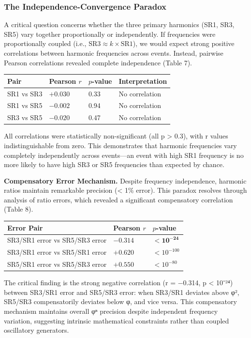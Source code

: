 \documentclass[11pt,a4paper]{article}
\begin{document}
\subsubsection{The Independence-Convergence Paradox}
A critical question concerns whether the three primary harmonics (SR1, SR3, SR5) vary together proportionally or independently. If frequencies were proportionally coupled (i.e., $\mathrm{SR3} \approx k \times \mathrm{SR1}$), we would expect strong positive correlations between harmonic frequencies across events. Instead, pairwise Pearson correlations revealed complete independence (Table 7).
\begin{table}[H]
    \centering
    \begin{tabular}{llll}
        \toprule
        Pair & Pearson $r$ & $p$-value & Interpretation \\
        \midrule
        SR1 vs SR3 & $+0.030$ & 0.33 & No correlation \\
        SR1 vs SR5 & $-0.002$ & 0.94 & No correlation \\
        SR3 vs SR5 & $-0.020$ & 0.47 & No correlation \\
        \bottomrule
    \end{tabular} \end{table}
All correlations were statistically non-significant (all p > 0.3), with r values indistinguishable from zero. This demonstrates that harmonic frequencies vary completely independently across events—an event with high SR1 frequency is no more likely to have high SR3 or SR5 frequencies than expected by chance.

\textbf{Compensatory Error Mechanism.}
Despite frequency independence, harmonic ratios maintain remarkable precision (< 1\% error). This paradox resolves through analysis of ratio errors, which revealed a significant compensatory correlation (Table 8).
\begin{table}[H]
    \centering
    \begin{tabular}{lll}
        \toprule
        Error Pair & Pearson $r$ & $p$-value \\
        \midrule
        SR3/SR1 error vs SR5/SR3 error & $\mathbf{-0.314}$ & $\mathbf{< 10^{-24}}$ \\
        SR3/SR1 error vs SR5/SR1 error & $+0.620$ & $< 10^{-100}$ \\
        SR5/SR1 error vs SR5/SR3 error & $+0.550$ & $< 10^{-80}$ \\
        \bottomrule
    \end{tabular} \end{table}
The critical finding is the strong negative correlation (r = −0.314, p < 10⁻²⁴) between SR3/SR1 error and SR5/SR3 error: when SR3/SR1 deviates above φ², SR5/SR3 compensatorily deviates below φ, and vice versa. This compensatory mechanism maintains overall φⁿ precision despite independent frequency variation, suggesting intrinsic mathematical constraints rather than coupled oscillatory generators.
\end{document}
